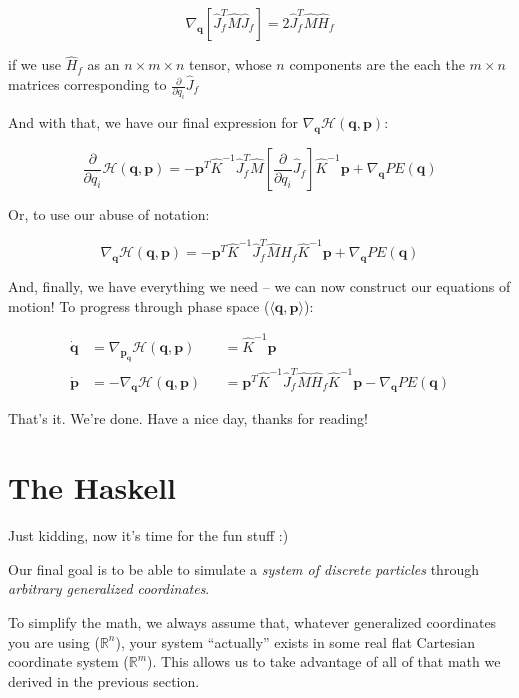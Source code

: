 \documentclass[]{article}
\begin{document}
\[
\nabla_{\mathbf{q}} \left[ \hat{J}_f^T \hat{M} \hat{J}_f \right] =
    2 \hat{J}_f^T \hat{M} \hat{H}_f
\]

if we use \(\hat{H}_f\) as an \(n \times m \times n\) tensor, whose \(n\)
components are the each the \(m \times n\) matrices corresponding to
\(\frac{\partial}{\partial q_i} \hat{J}_f\)

And with that, we have our final expression for
\(\nabla_{\mathbf{q}} \mathcal{H}(\mathbf{q},\mathbf{p})\):

\[
\frac{\partial}{\partial q_i} \mathcal{H}(\mathbf{q},\mathbf{p}) =
    - \mathbf{p}^T \hat{K}^{-1} \hat{J}_f^T \hat{M}
        \left[ \frac{\partial}{\partial q_i} \hat{J}_f \right] \hat{K}^{-1} \mathbf{p}
    + \nabla_{\mathbf{q}} PE(\mathbf{q})
\]

Or, to use our abuse of notation:

\[
\nabla_{\mathbf{q}} \mathcal{H}(\mathbf{q},\mathbf{p}) =
    - \mathbf{p}^T \hat{K}^{-1} \hat{J}_f^T \hat{M}
        \hat{H}_f \hat{K}^{-1} \mathbf{p}
    + \nabla_{\mathbf{q}} PE(\mathbf{q})
\]

And, finally, we have everything we need -- we can now construct our equations
of motion! To progress through phase space
(\(\langle \mathbf{q}, \mathbf{p}\rangle\)):

\[
\begin{aligned}
\dot{\mathbf{q}} & = \nabla_{\mathbf{p_q}} \mathcal{H}(\mathbf{q},\mathbf{p})
  && = \hat{K}^{-1} \mathbf{p} \\
\dot{\mathbf{p}} & = - \nabla_{\mathbf{q}} \mathcal{H}(\mathbf{q},\mathbf{p})
  && = \mathbf{p}^T \hat{K}^{-1} \hat{J}_f^T \hat{M}
        \hat{H}_f \hat{K}^{-1} \mathbf{p}
    - \nabla_{\mathbf{q}} PE(\mathbf{q})
\end{aligned}
\]

That's it. We're done. Have a nice day, thanks for reading!

\hypertarget{the-haskell}{%
\section{The Haskell}\label{the-haskell}}

Just kidding, now it's time for the fun stuff :)

Our final goal is to be able to simulate a \emph{system of discrete particles}
through \emph{arbitrary generalized coordinates}.

To simplify the math, we always assume that, whatever generalized coordinates
you are using (\(\mathbb{R}^n\)), your system ``actually'' exists in some real
flat Cartesian coordinate system (\(\mathbb{R}^m\)). This allows us to take
advantage of all of that math we derived in the previous section.
\end{document}
